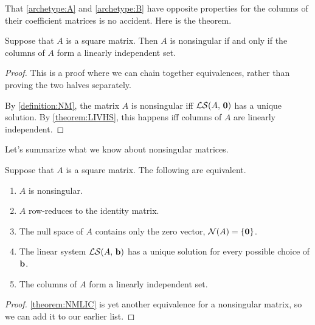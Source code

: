 \documentclass{ximera}
\begin{document}
That \ref{archetype:A} and \ref{archetype:B} have opposite properties
for the columns of their coefficient matrices is no accident.  Here is
the theorem.

\begin{theorem}
  \label{theorem:NMLIC} Suppose that $A$ is a square matrix.  Then $A$
  is nonsingular if and only if the columns of $A$ form a linearly
  independent set.

\begin{proof}
  This is a proof where we can chain together equivalences, rather
  than proving the two halves separately.

  By \ref{definition:NM}, the matrix $A$ is nonsingular iff
  $\mathcal{LS}\!\left(A,\,\mathbf{0}\right)$ has a unique solution.  By \ref{theorem:LIVHS},
  this happens iff columns of $A$ are linearly independent.
\end{proof}
\end{theorem}

Let's summarize what we know about nonsingular matrices.

\begin{theorem}
  Suppose that $A$ is a square matrix.  The following are equivalent.
  \begin{enumerate}
  \item $A$ is nonsingular.
  \item $A$ row-reduces to the identity matrix.
  \item The null space of $A$ contains only the zero vector, $\mathcal{N}\!\left(A\right)=\left\{\mathbf{0}\right\}$.
  \item The linear system $\mathcal{LS}\!\left(A,\,\mathbf{b}\right)$ has a unique
    solution for every possible choice of $\mathbf{b}$.
  \item The columns of $A$ form a linearly independent set.
  \end{enumerate}
  
  \begin{proof}
    \ref{theorem:NMLIC} is yet another equivalence for a nonsingular
    matrix, so we can add it to our earlier list.
  \end{proof}
\end{theorem}
\end{document}
